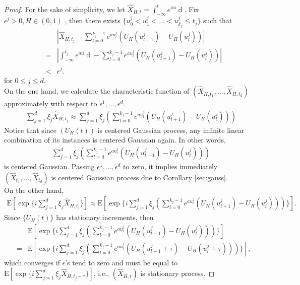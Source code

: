 \documentclass[a4paper, twoside, 11pt]{article}
\theoremstyle{definition}
\newcommand{\brkt}[1]{\left({#1} \right)}
\begin{document}
  \begin{proof}
	For the sake of simplicity, we let $\hat{X}_{H,t} = \int_{-\infty}^t e^{au}\mathop{dU_H(u)}$.
	Fix $\epsilon^j > 0, H\in (0,1)$ , then there exists  $\{u_0^j<u_1^j<\dots<u^j_{k_j}\le t_j\}$ such that
	\begin{eqnarray*}
	  &&|\hat{X}_{H,t_j} - \sum_{l=0}^{k_j-1} e^{au^j_l}(U_H(u^j_{l+1}) - U_H(u^j_{l}))|\\
	  &=& |\int_{-\infty}^{t_j} e^{au}\mathop{dU_H(u)} - \sum_{l=0}^{k_j-1} e^{au^j_l}(U_H(u^j_{l+1}) - U_H(u^j_{l}))|\\
	  &<& \epsilon^j.
	\end{eqnarray*}
	for $0 \le j \le d $.\\
	On the one hand, we calculate the characteristic function of $(\hat{X}_{H, t_1},\dots, \hat{X}_{H, t_d})$ approximately with respect to $\epsilon^1,\dots,\epsilon^d$.
	\begin{eqnarray*}
	  \sum_{j=1}^d \xi_j\hat{X}_{H,t_j} \approx \sum_{j=1}^d \xi_j\brkt{\sum_{l=0}^{k_j-1} e^{au^j_l}(U_H(u^j_{l+1}) - U_H(u^j_{l}))}
	\end{eqnarray*}
	Notice that since $(U_H(t))$ is centered Gaussian process, any infinite linear combination of its instances is centered Gaussian again. In other words, 
	\begin{eqnarray*}
	  \sum_{j=1}^d \xi_j \brkt{\sum_{l=0}^{k_j-1} e^{au^j_l}(U_H(u^j_{l+1}) - U_H(u^j_{l})) }
	\end{eqnarray*}
	is centered Gaussian. Passing $\epsilon^1,\dots,\epsilon^d$ to zero, it implies immediately $(\hat{X}_{t_1},\dots, \hat{X}_{t_d})$ is centered Gaussian process due to Corollary \ref{sec:gauss}.\\
	On the other hand,
	  \begin{eqnarray*}
	  \mathrm{E}[\exp\{i\sum_{j=1}^d \xi_j\hat{X}_{H, t_j}\}] \approx \mathrm{E}[\exp\{ i\sum_{j=1}^d \xi_j\brkt{\sum_{l=0}^{k_j-1} e^{au^j_l}(U_H(u^j_{l+1}) - U_H(u^j_{l})) }\}].
	\end{eqnarray*}
	Since $\{U_H(t)\}$ has stationary increments, then 
	\begin{eqnarray*}
	  && \mathrm{E}[\exp\{ i\sum_{j=1}^d \xi_j\brkt{\sum_{l=0}^{k_j-1} e^{au^j_l}(U_H(u^j_{l+1}) - U_H(u^j_{l})) }\}] \\
	  &=& \mathrm{E}[\exp\{ i\sum_{j=1}^d \xi_j\brkt{\sum_{l=0}^{k_j-1} e^{au^j_l}(U_H(u^j_{l+1}+\tau) - U_H(u^j_{l}+\tau)) }\}],
	\end{eqnarray*}
	which converges if $\epsilon$'s tend to zero and must be equal to $\mathrm{E}[\exp\{ i\sum_{j=1}^d \xi_j \hat{X}_{H, t_j+\tau}\}]$, i.e., $(\hat{X}_{H,t})$ is stationary process.
  \end{proof}
\end{document}

